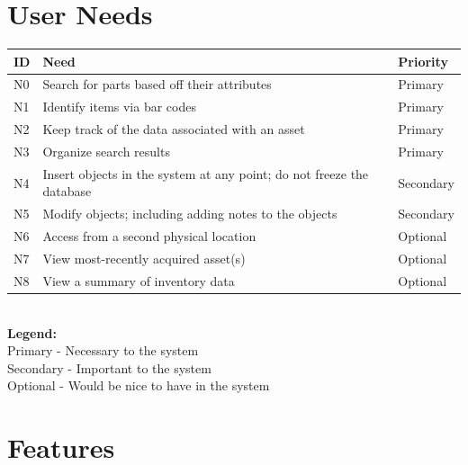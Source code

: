 \documentclass{article}
\begin{document}
\section{User Needs}
\begin{tabular}{ | p{0.15in} | p{4.0in} | p{.75in} |}
\hline
\textbf{ID} & \textbf{Need} & \textbf{Priority} \\
\hline
\hline
N0 & Search for parts based off their attributes & Primary \\
\hline
N1 & Identify items via bar codes & Primary \\
\hline
N2 & Keep track of the data associated with an asset & Primary \\
\hline
N3 & Organize search results & Primary \\
\hline
N4 & Insert objects in the system at any point; do not freeze the database & Secondary \\
\hline
N5 & Modify objects; including adding notes to the objects & Secondary \\
\hline
N6 & Access from a second physical location & Optional \\
\hline
N7 & View most-recently acquired asset(s) & Optional \\
\hline
N8 & View a summary of inventory data & Optional \\
\hline
\end{tabular} \\
\textbf{Legend:} \\
Primary - Necessary to the system \\
Secondary - Important to the system \\
Optional - Would be nice to have in the system \\

\section{Features}
\end{document}
